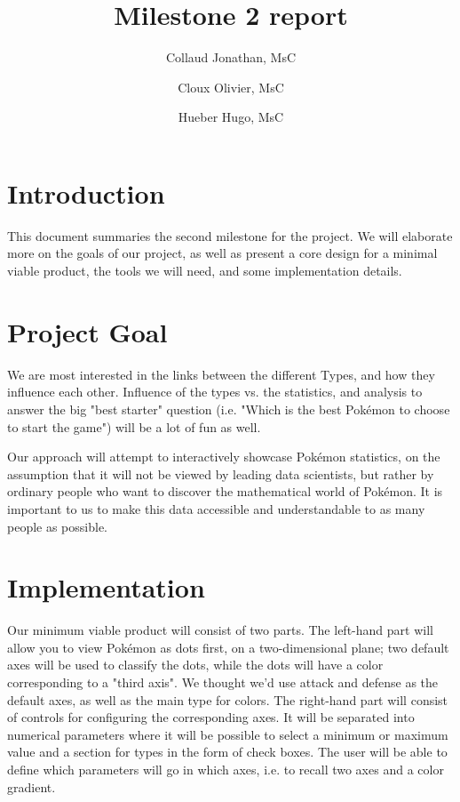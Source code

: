 \documentclass[10pt,conference,compsocconf]{IEEEtran}
\begin{document}
\title{Milestone 2 report}

\author[1]{Collaud Jonathan, MsC}
\author[1]{Cloux Olivier, MsC}
\author[1]{Hueber Hugo, MsC}


\maketitle

\section{Introduction}
This document summaries the second milestone for the project. We will elaborate more on the goals of our project, as well as present a core design for a minimal viable product, the tools we will need, and some implementation details.

\section{Project Goal}
We are most interested in the links between the different Types, and how they influence each other. Influence of the types vs. the statistics, and analysis to answer the big "best starter" question (i.e. "Which is the best Pokémon to choose to start the game") will be a lot of fun as well.

Our approach will attempt to interactively showcase Pokémon statistics, on the assumption that it will not be viewed by leading data scientists, but rather by ordinary people who want to discover the mathematical world of Pokémon. It is important to us to make this data accessible and understandable to as many people as possible.

\section{Implementation}
Our minimum viable product will consist of two parts. The left-hand part will allow you to view Pokémon as dots first, on a two-dimensional plane; two default axes will be used to classify the dots, while the dots will have a color corresponding to a "third axis". We thought we'd use attack and defense as the default axes, as well as the main type for colors. The right-hand part will consist of controls for configuring the corresponding axes. It will be separated into numerical parameters where it will be possible to select a minimum or maximum value and a section for types in the form of check boxes. The user will be able to define which parameters will go in which axes, i.e. to recall two axes and a color gradient.
\end{document}
